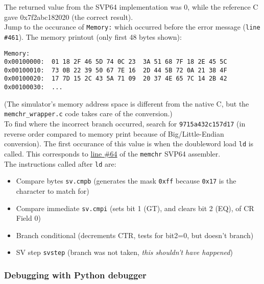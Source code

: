 The returned value from the \acrshort{SVP64} implementation was 0, while the reference C
gave 0x7f2abc182020 (the correct result).\\

Jump to the occurance of \texttt{Memory:} which occurred before the error
message (\texttt{line \#461}). The memory printout (only first 48 bytes shown):
\begin{verbatim}
Memory:
0x00100000:  01 18 2F 46 5D 74 0C 23  3A 51 68 7F 18 2E 45 5C
0x00100010:  73 0B 22 39 50 67 7E 16  2D 44 5B 72 0A 21 38 4F
0x00100020:  17 7D 15 2C 43 5A 71 09  20 37 4E 65 7C 14 2B 42
0x00100030:  ...
\end{verbatim}

(The simulator's memory address space is different from the native C,
but the \texttt{memchr\_wrapper.c} code takes care of the conversion.)\\

To find where the incorrect branch occurred, search for
\texttt{9715a432c157d17} (in reverse order compared to memory print because of
Big/Little-Endian conversion). The first occurance of this value is when
the doubleword load \texttt{ld} is called. This corresponds to
\href{https://github.com/ngisearchsvp64/glibc-svp64/blob/1afb94889b8ea2f85844e410f87e5a9b8e2e959f/svp64-port/svp64/memchr_svp64.s#L64}{line \#64}
of the \texttt{memchr} SVP64 assembler.\\

The instructions called after \texttt{ld} are:

\begin{itemize}
  \item Compare bytes \texttt{sv.cmpb} (generates the mask \texttt{0xff}
        because \texttt{0x17} is the character to match for)
  \item Compare immediate \texttt{sv.cmpi} (sets bit 1 (GT), and clears
        bit 2 (EQ), of \acrshort{CR} Field 0)
  \item Branch conditional (decrements \acrshort{CTR}, tests for bit2=0, but
        doesn't branch)
  \item \acrshort{SV} step \texttt{svstep} (branch was not taken,
        \textit{this shouldn't have happened})
\end{itemize}

\subsubsection{Debugging with Python debugger}

